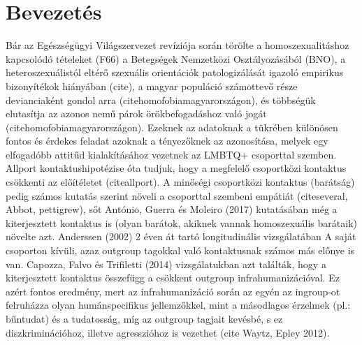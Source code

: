 \section{Bevezetés}
Bár az Egészségügyi Világszervezet revíziója során törölte a homoszexualitáshoz kapcsolódó tételeket (F66) a Betegségek Nemzetközi Osztályozásából (BNO), a heteroszexuálistól eltérő szexuális orientációk patologizálását igazoló empirikus bizonyítékok hiányában (cite), a magyar populáció számottevő része devianciaként gondol arra (citehomofobiamagyarországon), és többségük elutasítja az azonos nemű párok örökbefogadáshoz való jogát (citehomofobiamagyarországon). Ezeknek az adatoknak a tükrében különösen fontos és érdekes  feladat azoknak a tényezőknek az azonosítása, melyek egy elfogadóbb attitűd kialakításához vezetnek az LMBTQ+ csoporttal szemben. Allport kontaktushipotézise óta tudjuk, hogy a megfelelő csoportközi kontaktus csökkenti az előítéletet (citeallport). A minőségi csoportközi kontaktus (barátság) pedig számos kutatás szerint növeli a csoporttal szembeni empátiát (citeseveral, Abbot, pettigrew), sőt António, Guerra és Moleiro (2017) kutatásában még a kiterjesztett kontaktus is (olyan barátok, akiknek vannak homoszexuális barátaik) növelte azt. 
Anderssen (2002) 2 éven át tartó longitudinális vizsgálatában 
A saját csoporton kívüli, azaz outgroup tagokkal való kontaktusnak számos más előnye is van. Capozza, Falvo és Trifiletti (2014) vizsgálatukban azt találták, hogy a kiterjesztett kontaktus összefügg a csökkent outgroup infrahumanizációval. Ez azért fontos eredmény, mert az infrahumanizáció során az egyén az ingroup-ot felruházza olyan humánspecifikus jellemzőkkel, mint a másodlagos érzelmek (pl.: bűntudat) és a tudatosság, míg az outgroup tagjait kevésbé, s ez diszkriminációhoz, illetve agresszióhoz is vezethet (cite Waytz, Epley 2012). 
\\ \par
